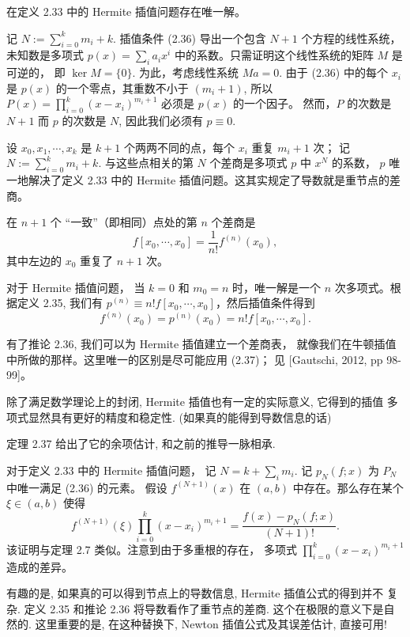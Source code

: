 \documentclass[a4paper]{ctexart}
\begin{document}
 在定义 2.33 中的 Hermite 插值问题存在唯一解。

 记 $N := \sum_{i=0}^k m_i + k$. 
插值条件 (2.36) 导出一个包含 $N + 1$ 个方程的线性系统，未知数是多项式 
$p(x) = \sum_{i} a_i x^i$ 中的系数。只需证明这个线性系统的矩阵 $M$ 是可逆的，
即 $\ker M = \{0\}$. 为此，考虑线性系统 $M a = 0$. 由于 (2.36) 中的每个 
$x_i$ 是 $p(x)$ 的一个零点，其重数不小于 $(m_i + 1)$, 
所以 $P(x) = \prod_{i=0}^k (x - x_i)^{m_i+1}$ 必须是 $p(x)$ 的一个因子。
然而，$P$ 的次数是 $N + 1$ 而 $p$ 的次数是 $N$, 因此我们必须有 $p \equiv 0$.

 设 $x_0 , x_1 , \cdots , x_k$ 
是 $k + 1$ 个两两不同的点，每个 $x_i$ 重复 $m_i + 1$ 次；
记 $N := \sum_{i=0}^k m_i + k$. 
与这些点相关的第 $N$ 个差商是多项式 $p$ 中 $x^N$ 的系数，
$p$ 唯一地解决了定义 2.33 中的 Hermite 插值问题。这其实规定了导数就是重节点的差商。

 在 $n + 1$ 个 ``一致''（即相同）点处的第 $n$ 
个差商是
\[
f [x_0 , \cdots , x_0] = \frac{1}{n!} f^{(n)} (x_0),
\]
其中左边的 $x_0$ 重复了 $n + 1$ 次。

 对于 Hermite 插值问题，
当 $k = 0$ 和 $m_0 = n$ 时，唯一解是一个 $n$ 次多项式。根据定义 2.35, 
我们有 $p^{(n)} \equiv n!f [x_0 , \cdots , x_0]$，然后插值条件得到
\[
f^{(n)} (x_0 ) = p^{(n)} (x_0 ) = n!f [x_0 , \cdots , x_0].
\]

 有了推论 2.36, 我们可以为 Hermite 插值建立一个差商表，
就像我们在牛顿插值中所做的那样。这里唯一的区别是尽可能应用 (2.37)；
见 [Gautschi, 2012, pp 98-99]。

除了满足数学理论上的封闭, Hermite 插值也有一定的实际意义, 它得到的插值
多项式显然具有更好的精度和稳定性. (如果真的能得到导数信息的话)

定理 2.37 给出了它的余项估计, 和之前的推导一脉相承.

 对于定义 2.33 中的 Hermite 插值问题，
记 $N = k + \sum_i m_i$. 记 $p_N(f ; x)$ 为 $P_N$ 中唯一满足 (2.36) 的元素。
假设 $f^{(N+1)}(x)$ 在 $(a, b)$ 中存在。那么存在某个 $\xi \in (a, b)$ 使得
\[
f^{(N+1)}(\xi) \prod_{i=0}^{k} (x - x_i)^{m_i + 1} 
= \frac{f(x) - p_N(f ; x)}{(N + 1)!}. \tag{2.38}
\]
 该证明与定理 2.7 类似。注意到由于多重根的存在，
多项式 $\prod_{i=0}^{k} (x - x_i)^{m_i + 1}$ 造成的差异。

有趣的是, 如果真的可以得到节点上的导数信息, Hermite 插值公式的得到并不
复杂. 定义 2.35 和推论 2.36 将导数看作了重节点的差商. 这个在极限的意义下是自然的. 
这里重要的是, 在这种替换下, Newton 插值公式及其误差估计, 直接可用!
\end{document}
